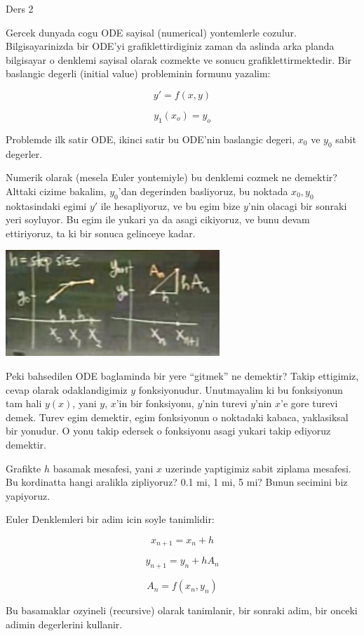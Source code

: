\documentclass[12pt,fleqn]{article}
\begin{document}
Ders 2

Gercek dunyada cogu ODE sayisal (numerical) yontemlerle
cozulur. Bilgisayarinizda bir ODE'yi grafiklettirdiginiz zaman da aslinda arka
planda bilgisayar o denklemi sayisal olarak cozmekte ve sonucu
grafiklettirmektedir. Bir baslangic degerli (initial value) probleminin formunu
yazalim: 

\[ y' = f(x,y) \]

\[ y_1(x_o) = y_o \]

Problemde ilk satir ODE, ikinci satir bu ODE'nin baslangic degeri, $x_0$ ve $y_0$
sabit degerler. 

Numerik olarak (mesela Euler yontemiyle) bu denklemi cozmek ne demektir? Alttaki
cizime bakalim, $y_0$'dan degerinden basliyoruz, bu noktada $x_0,y_0$
noktasindaki egimi $y'$ ile hesapliyoruz, ve bu egim bize $y$'nin olacagi bir
sonraki yeri soyluyor. Bu egim ile yukari ya da asagi cikiyoruz, ve bunu devam
ettiriyoruz, ta ki bir sonuca gelinceye kadar.

\includegraphics[height=4cm]{2_1.png}

Peki bahsedilen ODE baglaminda bir yere ``gitmek'' ne demektir? Takip ettigimiz,
cevap olarak odaklandigimiz $y$ fonksiyonudur. Unutmayalim ki bu fonksiyonun tam
hali $y(x)$, yani $y$, $x$'in bir fonksiyonu, $y$'nin turevi $y$'nin $x$'e gore
turevi demek. Turev egim demektir, egim fonksiyonun o noktadaki kabaca,
yaklasiksal bir yonudur. O yonu takip edersek o fonksiyonu asagi yukari takip
ediyoruz demektir.

Grafikte $h$ basamak mesafesi, yani $x$ uzerinde yaptigimiz sabit ziplama
mesafesi. Bu kordinatta hangi aralikla zipliyoruz? 0.1 mi, 1 mi, 5 mi? Bunun
secimini biz yapiyoruz. 

Euler Denklemleri bir adim icin soyle tanimlidir:

\[ x_{n+1} = x_n + h \]

\[ y_{n+1} = y_n + hA_n \]

\[ A_n = f(x_n, y_n) \]

Bu basamaklar ozyineli (recursive) olarak tanimlanir, bir sonraki adim, bir
onceki adimin degerlerini kullanir. 
\end{document}
